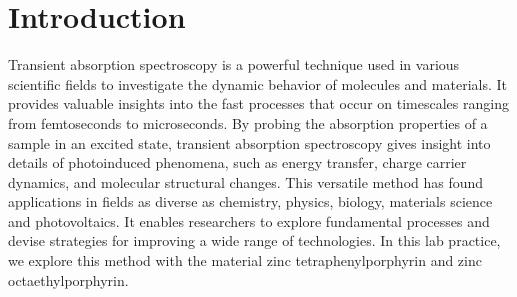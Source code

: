 

\chapter{Introduction}
\label{chap:einleitung}

Transient absorption spectroscopy is a powerful technique used in various scientific fields to investigate the dynamic behavior of molecules and materials. It provides valuable insights into the fast processes that occur on timescales ranging from femtoseconds to microseconds. By probing the absorption properties of a sample in an excited state, transient absorption spectroscopy gives insight into details of photoinduced phenomena, such as energy transfer, charge carrier dynamics, and molecular structural changes. This versatile method has found applications in fields as diverse as chemistry, physics, biology, materials science and photovoltaics. It enables researchers to explore fundamental processes and devise strategies for improving a wide range of technologies. In this lab practice, we explore this method with the material zinc tetraphenylporphyrin and zinc octaethylporphyrin.

